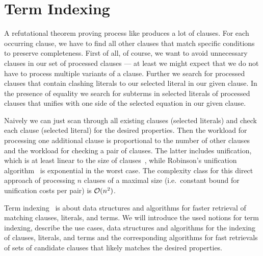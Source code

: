 






\section{Term Indexing}\label{sec:term:indexing}








A refutational theorem proving process like \InstGenEQ{} produces a lot of clauses.
For each occurring clause, we have to find
all other clauses that match specific conditions to preserve completeness.
First of all, of course, we want to avoid unnecessary clauses in our set of processed clauses
--- at least we might expect that we do not have to process multiple variants of a clause.
Further we search for processed clauses that contain clashing literals to our selected literal in our given clause.
In the presence of equality we search for subterms in selected literals of processed clauses that unifies with one side of the selected equation in our given clause.

Naively we can just scan through all existing clauses (selected literals)
and check each clause (selected literal) for the desired properties.
	Then the workload for processing one additional clause is proportional to the number of other clauses and
	the workload for checking a pair of clauses.
	The latter includes unification, which is at least linear to the size of clauses~\cite{ALBERT19933},
	while Robinson's unification algorithm~\cite{Robinson:1965:MLB:321250.321253} is exponential in the worst case.
	The complexity class for this direct approach of processing \( n \) clauses of a maximal size
	(i.e.\ constant bound for unification costs per pair) is \( \mathcal{O}(n^2) \).

	Term indexing~\cite{Graf1998} is about data structures and algorithms
	for faster retrieval of matching clauses, literals, and terms.
	We will introduce the used notions for term indexing, describe
	the use cases, data structures and algorithms for the indexing
	of clauses, literals, and terms and the corresponding algorithms
	for fast retrievals of sets of candidate clauses that likely matches the desired properties.

